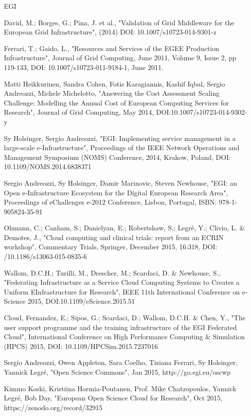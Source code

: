 \begin{sitedescription}{EGI}
\begin{compactenum}
\item David, M.; Borges, G.; Pina, J. et al., "Validation of Grid Middleware for the European Grid Infrastructure", (2014) DOI: 10.1007/s10723-014-9301-z 
\item Ferrari, T.; Gaido, L., "Resources and Services of the EGEE Production Infrastructure", Journal of Grid Computing, June 2011, Volume 9, Issue 2, pp 119-133, DOI: 10.1007/s10723-011-9184-1, June 2011. 
\item Matti Heikkurinen, Sandra Cohen, Fotis Karagiannis, Kashif Iqbal, Sergio Andreozzi, Michele Michelotto, "Answering the Cost Assessment Scaling Challenge: Modelling the Annual Cost of European Computing Services for Research", Journal of Grid Computing, May 2014, DOI:10.1007/s10723-014-9302-y 
\item Sy Holsinger, Sergio Andreozzi, "EGI: Implementing service management in a large-scale e-Infrastructure", Proceedings of the IEEE Network Operations and Management Symposium (NOMS) Conference, 2014, Krakow, Poland, DOI: 10.1109/NOMS.2014.6838371
\item Sergio Andreozzi, Sy Holsinger, Damir Marinovic, Steven Newhouse, "EGI: an Open e-Infrastructure Ecosystem for the Digital European Research Area", Proceedings of eChallenges e-2012 Conference, Lisbon, Portugal, ISBN: 978-1-905824-35-91 
\item Ohmann, C.; Canham, S.; Danielyan, E.; Robertshaw, S.; Legr\'e, Y.; Clivio, L. & Demotes, J., "Cloud computing and clinical trials: report from an ECRIN workshop", Commentary Trials, Springer, December 2015, 16:318, DOI: /10.1186/s13063-015-0835-6 \newline
\item Wallom, D.C.H.; Turilli, M., Drescher, M.; Scardaci, D. \& Newhouse, S., "Federating Infrastructure as a Service Cloud Computing Systems to Creates a Uniform EInfrastructure for Research", IEEE 11th International Conference on e-Science 2015, DOI:10.1109/eScience.2015.51
\item Cloud, Fernandez, E.; Sipos, G.; Scardaci, D.; Wallom, D.C.H. \& Chen, Y., "The user support programme and the training infrastructure of the EGI Federated Cloud", International Conference on High Performance Computing & Simulation (HPCS) 2015, DOI: 10.1109/HPCSim.2015.7237016 
\item Sergio Andreozzi, Owen Appleton, Sara Coelho, Tiziana Ferrari, Sy Holsinger, Yannick Legr\'e, "Open Science Commons", Jan 2015, http://go.egi.eu/oscwp
\item Kimmo Koski, Kristiina Hormia-Poutanen, Prof. Mike Chatzopoulos, Yannick Legré, Bob Day, "European Open Science Cloud for Research", Oct 2015, https://zenodo.org/record/32915
\end{compactenum}


\end{sitedescription}
